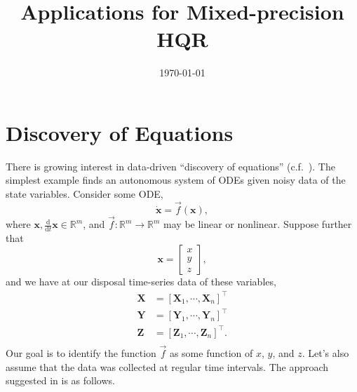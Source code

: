 \documentclass{article}
\title{Applications for Mixed-precision HQR}
\date{\today}
\newcommand{\R}{\mathbb{R}}
\newcommand{\ddt}{\frac{\mathrm{d}}{\mathrm{d}t}}
\newcommand{\bb}[1]{\mathbf{#1}}
\theoremstyle{definition}
\begin{document}
\maketitle
\section{Discovery of Equations}
There is growing interest in data-driven ``discovery of equations'' (c.f.~\cite{Brunton2016}). 
The simplest example finds an autonomous system of ODEs given noisy data of the state variables. 
Consider some ODE,
\begin{equation}
\dot{\bb{x}} = \vec{f}(\bb{x}),  
\end{equation}
where $\bb{x}, \ddt \bb{x} \in\R^{m}$, and $\vec{f}:\R^m\rightarrow \R^m$ may be linear or nonlinear.
Suppose further that \[\bb{x}=\begin{bmatrix}
x\\
y\\
z
\end{bmatrix},\]
and we have at our disposal time-series data of these variables,
\begin{align*}
\bb{X} &= [\bb{X}_1, \cdots, \bb{X}_n]^{\top}
\\
\bb{Y} &= [\bb{Y}_1, \cdots, \bb{Y}_n]^{\top}\\
\bb{Z} &= [\bb{Z}_1, \cdots, \bb{Z}_n]^{\top}.\\
\end{align*}
Our goal is to identify the function $\vec{f}$ as some function of $x$, $y$, and $z$.
Let's also assume that the data was collected at regular time intervals.  
The approach suggested in \cite{Brunton2016} is as follows. 
\end{document}
